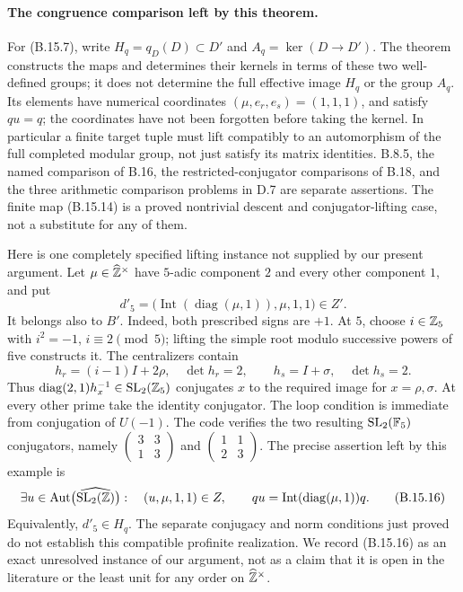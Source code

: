 \paragraph{The congruence comparison left by this theorem.}
For (B.15.7), write \(H_q=q_D(D)\subset D'\) and
\(A_q=\ker(D\to D')\). The theorem constructs the maps and
determines their kernels in terms of these two well-defined groups;
it does not determine the full effective image \(H_q\) or the
group \(A_q\). Its elements have numerical coordinates
\((\mu,e_r,e_s)=(1,1,1)\), and satisfy \(qu=q\); the coordinates
have not been forgotten before taking the kernel. In particular a finite target tuple must lift
compatibly to an automorphism of the full completed modular group,
not just satisfy its matrix identities. B.8.5, the named comparison
of B.16, the restricted-conjugator comparisons of B.18, and the
three arithmetic comparison problems in D.7 are separate assertions.
The finite map (B.15.14) is a proved nontrivial descent and
conjugator-lifting case, not a substitute for any of them.

Here is one completely specified lifting instance not supplied by
our present argument. Let \(\mu\in\widehat{\mathbb Z}^\times\) have
\(5\)-adic component \(2\) and every other component \(1\),
and put
\[
 d'_5=\bigl(\operatorname{Int}(\operatorname{diag}(\mu,1)),
                     \mu,1,1\bigr)\in Z'.
 \tag{B.15.15}
\]
It belongs also to \(B'\). Indeed, both prescribed signs are
\(+1\). At \(5\), choose \(i\in\mathbb Z_5\) with \(i^2=-1\),
\(i\equiv2\pmod5\); lifting the simple root modulo successive
powers of five constructs it. The centralizers contain
\[
 h_r=(i-1)I+2\rho,\quad \det h_r=2,
 \qquad h_s=I+\sigma,\quad\det h_s=2.
\]
Thus \(\operatorname{diag}(2,1)h_x^{-1}\in\operatorname{SL}_2(\mathbb Z_5)\)
conjugates \(x\) to the required image for \(x=\rho,\sigma\).
At every other prime take the identity conjugator. The loop condition
is immediate from conjugation of \(U(-1)\). The code verifies the
two resulting \(\operatorname{SL}_2(\mathbb F_5)\) conjugators, namely
\(\left(\begin{smallmatrix}3&3\\1&3\end{smallmatrix}\right)\)
and \(\left(\begin{smallmatrix}1&1\\2&3\end{smallmatrix}\right)\).
The precise assertion left by this example is
\[
 \exists u\in\operatorname{Aut}\bigl(\widehat{\operatorname{SL}_2(\mathbb Z)}\bigr):\quad
 (u,\mu,1,1)\in Z,
 \qquad qu=\operatorname{Int}(\operatorname{diag}(\mu,1))q.
 \tag{B.15.16}
\]
Equivalently, \(d'_5\in H_q\). The separate conjugacy and norm
conditions just proved do not establish this compatible profinite
realization. We record (B.15.16) as an exact unresolved instance of
our argument, not as a claim that it is open in the literature or
the least unit for any order on \(\widehat{\mathbb Z}^\times\).
